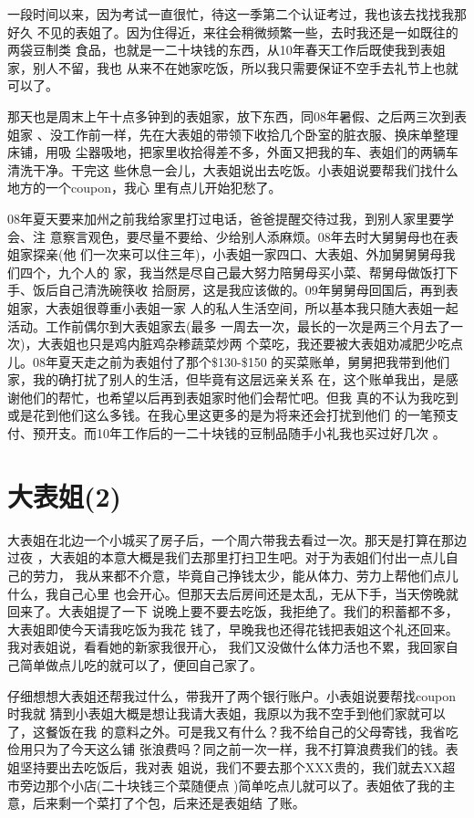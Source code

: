\documentclass[12pt]{book}
\begin{document}
一段时间以来，因为考试一直很忙，待这一季第二个认证考过，我也该去找找我那好久
不见的表姐了。因为住得近，来往会稍微频繁一些，去时我还是一如既往的两袋豆制类
食品，也就是一二十块钱的东西，从10年春天工作后既使我到表姐家，别人不留，我也
从来不在她家吃饭，所以我只需要保证不空手去礼节上也就可以了。

那天也是周末上午十点多钟到的表姐家，放下东西，同08年暑假、之后两三次到表姐家
、没工作前一样，先在大表姐的带领下收拾几个卧室的脏衣服、换床单整理床铺，用吸
尘器吸地，把家里收拾得差不多，外面又把我的车、表姐们的两辆车清洗干净。干完这
些休息一会儿，大表姐说出去吃饭。小表姐说要帮我们找什么地方的一个coupon，我心
里有点儿开始犯愁了。

08年夏天要来加州之前我给家里打过电话，爸爸提醒交待过我，到别人家里要学会、注
意察言观色，要尽量不要给、少给别人添麻烦。08年去时大舅舅母也在表姐家探亲(他
们一次来可以住三年)，小表姐一家四口、大表姐、外加舅舅舅母我们四个，九个人的
家，我当然是尽自己最大努力陪舅母买小菜、帮舅母做饭打下手、饭后自己清洗碗筷收
拾厨房，这是我应该做的。09年舅舅母回国后，再到表姐家，大表姐很尊重小表姐一家
人的私人生活空间，所以基本我只随大表姐一起活动。工作前偶尔到大表姐家去(最多
一周去一次，最长的一次是两三个月去了一次)，大表姐也只是鸡内脏鸡杂糁蔬菜炒两
个菜吃，我还要被大表姐劝减肥少吃点儿。08年夏天走之前为表姐付了那个\$130-\$150
的买菜账单，舅舅把我带到他们家，我的确打扰了别人的生活，但毕竟有这层远亲关系
在，这个账单我出，是感谢他们的帮忙，也希望以后再到表姐家时他们会帮忙吧。但我
真的不认为我吃到或是花到他们这么多钱。在我心里这更多的是为将来还会打扰到他们
的一笔预支付、预开支。而10年工作后的一二十块钱的豆制品随手小礼我也买过好几次
。
\section{大表姐(2)}
\label{sec-9-28}

大表姐在北边一个小城买了房子后，一个周六带我去看过一次。那天是打算在那边过夜
，大表姐的本意大概是我们去那里打扫卫生吧。对于为表姐们付出一点儿自己的劳力，
我从来都不介意，毕竟自己挣钱太少，能从体力、劳力上帮他们点儿什么，我自己心里
也会开心。但那天去后房间还是太乱，无从下手，当天傍晚就回来了。大表姐提了一下
说晚上要不要去吃饭，我拒绝了。我们的积蓄都不多，大表姐即使今天请我吃饭为我花
钱了，早晚我也还得花钱把表姐这个礼还回来。我对表姐说，看看她的新家我很开心，
我们又没做什么体力活也不累，我回家自己简单做点儿吃的就可以了，便回自己家了。

仔细想想大表姐还帮我过什么，带我开了两个银行账户。小表姐说要帮找coupon时我就
猜到小表姐大概是想让我请大表姐，我原以为我不空手到他们家就可以了，这餐饭在我
的意料之外。可是我又有什么？我不给自己的父母寄钱，我省吃俭用只为了今天这么铺
张浪费吗？同之前一次一样，我不打算浪费我们的钱。表姐坚持要出去吃饭后，我对表
姐说，我们不要去那个XXX贵的，我们就去XX超市旁边那个小店(二十块钱三个菜随便点
)简单吃点儿就可以了。表姐依了我的主意，后来剩一个菜打了个包，后来还是表姐结
了账。
\end{document}
